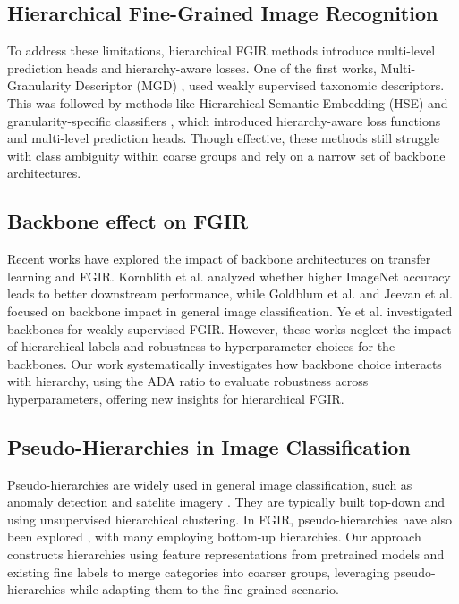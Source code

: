 \documentclass[conference]{IEEEtran}
\begin{document}
\subsection{Hierarchical Fine-Grained Image Recognition}
To address these limitations, hierarchical FGIR methods introduce multi-level prediction heads and hierarchy-aware losses. One of the first works, Multi-Granularity Descriptor (MGD) \cite{wang_multiple_2015}, used weakly supervised taxonomic descriptors. This was followed by methods like Hierarchical Semantic Embedding (HSE) \cite{chen_fine-grained_2018} and granularity-specific classifiers \cite{chang_your_2021}, which introduced hierarchy-aware loss functions and multi-level prediction heads. Though effective, these methods still struggle with class ambiguity within coarse groups and rely on a narrow set of backbone architectures.

\subsection{Backbone effect on FGIR}
Recent works have explored the impact of backbone architectures on transfer learning and FGIR. Kornblith et al. \cite{kornblith_better_2019} analyzed whether higher ImageNet accuracy leads to better downstream performance, while Goldblum et al. \cite{goldblum_battle_2023} and Jeevan et al. \cite{jeevan_which_2025} focused on backbone impact in general image classification. Ye et al. \cite{ye_image_2024} investigated backbones for weakly supervised FGIR. However, these works neglect the impact of hierarchical labels and robustness to hyperparameter choices for the backbones. Our work systematically investigates how backbone choice interacts with hierarchy, using the ADA ratio to evaluate robustness across hyperparameters, offering new insights for hierarchical FGIR.

\subsection{Pseudo-Hierarchies in Image Classification}
Pseudo-hierarchies are widely used in general image classification, such as anomaly detection \cite{wang_hierarchical_2022} and satelite imagery \cite{liu_clustering-based_2025}. They are typically built top-down and using unsupervised hierarchical clustering. In FGIR, pseudo-hierarchies have also been explored \cite{znalezniak_contrastive_2023}, with many employing bottom-up hierarchies. Our approach constructs hierarchies using feature representations from pretrained models and existing fine labels to merge categories into coarser groups, leveraging pseudo-hierarchies while adapting them to the fine-grained scenario.
\end{document}
